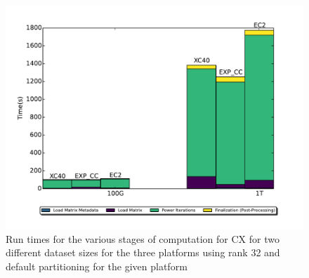     \begin{figure} [h!btp]
    \begin{centering}
    \includegraphics[scale=0.4]{images/CX_Size_Scaling_New_Colors_Axes_Rank_32_Partitions_default.pdf}
    \end{centering}
    \caption{ Run times for the various stages of computation for CX for two different dataset sizes for the three platforms using rank 32 and default partitioning for the given platform}
    \label{fig:h2hrank32} 
    \end{figure}
    
